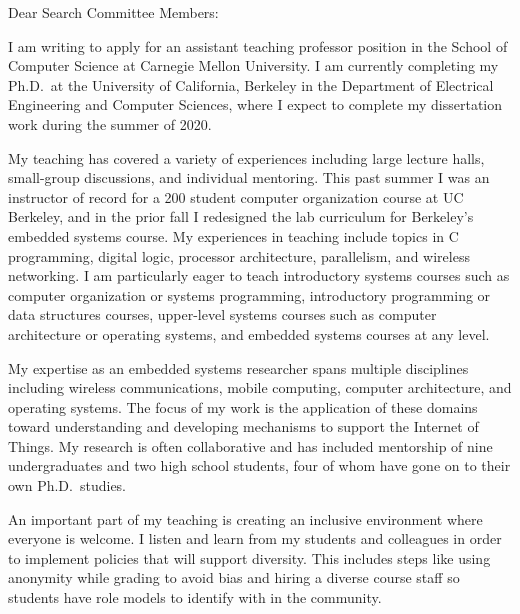 \documentclass{letter}
\begin{document}
\begin{letter}{}
\date{}

\opening{Dear Search Committee Members:}

I am writing to apply for an
assistant teaching professor
position in the
School of Computer Science
at Carnegie Mellon University.
%
I am currently completing my Ph.D.\ at the University of California, Berkeley
in the Department of Electrical Engineering and Computer Sciences, where I
expect to complete my dissertation work during the summer of 2020.

My teaching has covered a variety of experiences including
large lecture halls, small-group discussions, and individual mentoring.
%
This past summer I was an instructor of record for a 200 student computer
organization course at UC Berkeley, and in the prior fall I redesigned the lab
curriculum for Berkeley's embedded systems course.
%
My experiences in teaching include topics in C programming, digital logic,
processor architecture, parallelism, and wireless networking.
%
%
I am particularly eager to teach
introductory systems courses such as computer organization or systems programming,
introductory programming or data structures courses,
upper-level systems courses such as computer architecture or operating systems,
and embedded systems courses at any level.

My expertise as an embedded systems researcher spans multiple disciplines
including wireless communications, mobile computing, computer architecture, and
operating systems.
%
The focus of my work is the application of these domains toward understanding
and developing mechanisms to support the Internet of Things.
%
My research is often collaborative and has included mentorship of nine
undergraduates and two high school students, four of whom have gone on to
their own Ph.D.\ studies.


An important part of my teaching is creating an inclusive environment where
everyone is welcome. I listen and learn from my students and colleagues
in order to implement policies that will support diversity.
%
This includes steps like using anonymity while grading to avoid bias and hiring
a diverse course staff so students have role models to identify with in the community.


\end{letter}
\end{document}
